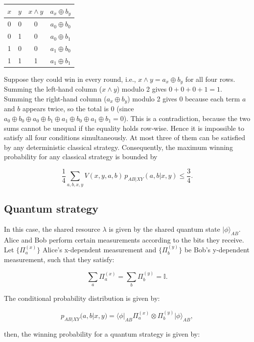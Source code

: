 \documentclass[12pt, letterpaper]{article}
\begin{document}
\begin{center}
    \begin{tabular}{|c|c|c|c|}
        \hline
        $x$ & $y$ & $x \land y$ & $a_x \oplus b_y$ \\
        \hline
        0 & 0 & 0 & $a_0 \oplus b_0$ \\
        0 & 1 & 0 & $a_0 \oplus b_1$ \\
        1 & 0 & 0 & $a_1 \oplus b_0$ \\
        1 & 1 & 1 & $a_1 \oplus b_1$ \\
        \hline
    \end{tabular}
\end{center}

Suppose they could win in every round, i.e., $x \land y = a_x \oplus b_y$ for all four rows. Summing the left‑hand column ($x \land y$) modulo 2 gives $0+0+0+1 = 1$. Summing the right‑hand column ($a_x \oplus b_y$) modulo 2 gives $0$ because each term $a$ and $b$ appears twice, so the total is $0$ (since $a_0\oplus b_0 \oplus a_0\oplus b_1 \oplus a_1\oplus b_0 \oplus a_1\oplus b_1 = 0$). This is a contradiction, because the two sums cannot be unequal if the equality holds row‑wise. Hence it is impossible to satisfy all four conditions simultaneously. At most three of them can be satisfied by any deterministic classical strategy. Consequently, the maximum winning probability for any classical strategy is bounded by

\[
\frac{1}{4}\sum_{a,b,x,y} V(x,y,a,b) \, p_{AB|XY}(a,b|x,y) \le \frac{3}{4}.
\]

\subsection{Quantum strategy}

In this case, the shared resource $\lambda$ is given by the shared quantum state $|\phi\rangle_{AB}$. Alice and Bob perform certain measurements according to the bits they receive. Let $\{ \Pi_a^{(x)} \}$ Alice's x-dependent measurement and $\{ \Pi_b^{(y)} \}$ be Bob's y-dependent measurement, such that they satisfy:

\[
\sum_a \Pi_a^{(x)} = \sum_b \Pi_b^{(y)} = \mathbb{I}.
\]

The conditional probability distribution is given by:

\[
p_{AB|XY}(a,b | x,y) = \langle \phi |_{AB} \Pi_a^{(x)} \otimes \Pi_b^{(y)} | \phi \rangle_{AB},
\]

then, the winning probability for a quantum strategy is given by:
\end{document}
